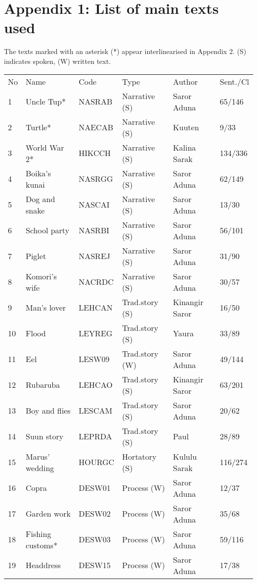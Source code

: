 
\section*{Appendix 1: List of main texts used}


The texts marked with an asterisk (*) appear interlinearised in Appendix 2.
{(S) indicates spoken, (W) written text.}

\begin{tabular}{llllll}
No &  Name & Code & Type & Author & Sent./Cl\\
1 & Uncle Tup* &  NASRAB & Narrative (S) &  Saror Aduna &  65/146\\
2 & Turtle*  & NAECAB & Narrative (S) & Kuuten  & 9/33 \\
3 & World War 2*  & HIKCCH & Narrative (S) & Kalina Sarak  & 134/336 \\
4 & Boika's kunai  & NASRGG & Narrative (S) & Saror Aduna  & 62/149 \\
5 & Dog and snake  & NASCAI & Narrative (S) & Saror Aduna  & 13/30 \\
6 & School party  & NASRBI & Narrative (S) & Saror Aduna  & 56/101 \\
7 & Piglet  & NASREJ & Narrative (S) & Saror Aduna  & 31/90 \\
8 & Komori's wife  & NACRDC & Narrative (S) & Saror Aduna  & 30/57 \\
9 & Man's lover  & LEHCAN & Trad.story (S) & Kinangir Saror  & 16/50 \\
10 & Flood  & LEYREG & Trad.story (S) & Yaura  & 33/89 \\
11 & Eel  & LESW09 & Trad.story (W) & Saror Aduna  & 49/144 \\
12 & Rubaruba  & LEHCAO & Trad.story (S) & Kinangir Saror  & 63/201 \\
13 & Boy and flies  & LESCAM & Trad.story (S) & Saror Aduna  & 20/62 \\
14 & Suun story  & LEPRDA & Trad.story (S) & Paul  & 28/89 \\
15 & Marus' wedding  & HOURGC & Hortatory (S) & Kululu Sarak  & 116/274 \\
16 & Copra  & DESW01 & Process (W) & Saror Aduna  & 12/37 \\
17 & Garden work  & DESW02 & Process (W) & Saror Aduna  & 35/68 \\
18 & Fishing customs*  & DESW03 & Process (W) & Saror Aduna  & 59/116 \\
19 & Headdress  & DESW15 & Process (W) & Saror Aduna  & 17/38 \\

\end{tabular}
